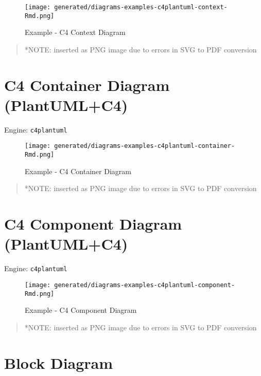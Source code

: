 \documentclass[12pt,a4paper,12pt,oneside,openany]{book}
\begin{document}
\begin{figure}
\centering
\texttt{[image: generated/diagrams-examples-c4plantuml-context-Rmd.png]}
\caption{Example - C4 Context Diagram}
\end{figure}

\begin{quote}
*NOTE: inserted as PNG image due to errors in SVG to PDF conversion
\end{quote}

\newpage

\section{C4 Container Diagram (PlantUML+C4)}\label{c4-container-diagram-plantumlc4}

Engine: \texttt{c4plantuml}

\begin{figure}
\centering
\texttt{[image: generated/diagrams-examples-c4plantuml-container-Rmd.png]}
\caption{Example - C4 Container Diagram}
\end{figure}

\begin{quote}
*NOTE: inserted as PNG image due to errors in SVG to PDF conversion
\end{quote}

\newpage

\section{C4 Component Diagram (PlantUML+C4)}\label{c4-component-diagram-plantumlc4}

Engine: \texttt{c4plantuml}

\begin{figure}
\centering
\texttt{[image: generated/diagrams-examples-c4plantuml-component-Rmd.png]}
\caption{Example - C4 Component Diagram}
\end{figure}

\begin{quote}
*NOTE: inserted as PNG image due to errors in SVG to PDF conversion
\end{quote}

\newpage

\section{Block Diagram}\label{block-diagram}
\end{document}
